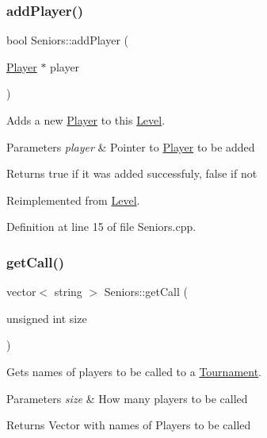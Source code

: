 \subsubsection{\texorpdfstring{add\+Player()}{addPlayer()}}
{\footnotesize\ttfamily bool Seniors\+::add\+Player (\begin{DoxyParamCaption}\item[{\hyperlink{class_player}{Player} $\ast$}]{player }\end{DoxyParamCaption})\hspace{0.3cm}{\ttfamily [virtual]}}



Adds a new \hyperlink{class_player}{Player} to this \hyperlink{class_level}{Level}. 


\begin{DoxyParams}{Parameters}
{\em player} & Pointer to \hyperlink{class_player}{Player} to be added \\
\hline
\end{DoxyParams}
\begin{DoxyReturn}{Returns}
true if it was added successfuly, false if not 
\end{DoxyReturn}


Reimplemented from \hyperlink{class_level_a66290778fa4bcd2f29b9ff3e605b2902}{Level}.



Definition at line 15 of file Seniors.\+cpp.

\hypertarget{class_seniors_a3b2fbe1e5d735c7659a195cea6333a0b}{}\label{class_seniors_a3b2fbe1e5d735c7659a195cea6333a0b} 
\subsubsection{\texorpdfstring{get\+Call()}{getCall()}}
{\footnotesize\ttfamily vector$<$ string $>$ Seniors\+::get\+Call (\begin{DoxyParamCaption}\item[{unsigned int}]{size }\end{DoxyParamCaption})\hspace{0.3cm}{\ttfamily [virtual]}}



Gets names of players to be called to a \hyperlink{class_tournament}{Tournament}. 


\begin{DoxyParams}{Parameters}
{\em size} & How many players to be called \\
\hline
\end{DoxyParams}
\begin{DoxyReturn}{Returns}
Vector with names of Players to be called 
\end{DoxyReturn}


